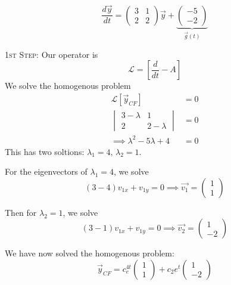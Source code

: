 \documentclass[10pt]{scrartcl}
\begin{document}
\begin{example}
\[
  \frac{d\vec{y}}{dt} = \begin{pmatrix}
 3 & 1\\ 2 & 2	
 \end{pmatrix}\vec{y} + \underbrace{\begin{pmatrix}
  -5 \\ -2
\end{pmatrix}}_{\vec{g}(t)}
\]

\textsc{1st Step:} Our operator is
\[
  \mathcal{L} = \left[\frac{d}{dt} -A\right]
\]
We solve the homogenous problem
\begin{align*}
  \mathcal{L}[\vec{y}_{CF}] &= 0\\
  \begin{vmatrix}
  3 - \lambda & 1\\ 2 & 2 -\lambda 	
  \end{vmatrix} &= 0\\
  \implies \lambda^2 - 5\lambda + 4 &= 0
\end{align*}
This has two soltions: $\lambda_1 = 4,\, \lambda_2 = 1$. 

For the eigenvectors of $\lambda_1 = 4$, we solve \[(3-4)v_{1x} + v_{1y} = 0 \implies \vec{v_1} = \begin{pmatrix}
 1 \\ 1	
 \end{pmatrix}\]
 
 Then for $\lambda_2 = 1$, we solve \[(3-1)v_{1x} + v_{1y} = 0 \implies \vec{v_2} = \begin{pmatrix}
  1 \\ -2
\end{pmatrix}\]

We have now solved the homogenous problem:
\[
  \vec{y}_{CF} = c_e^{4t}\begin{pmatrix}
  1 \\ 1
\end{pmatrix} + c_2e^t
\begin{pmatrix}
  1 \\ -2
\end{pmatrix}
\]


\end{example}
\end{document}
